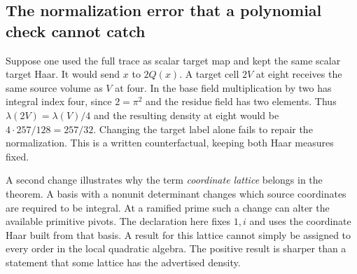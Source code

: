 \documentclass[12pt,letterpaper]{article}
\begin{document}
\subsection{The normalization error that a polynomial check cannot catch}
Suppose one used the full trace as scalar target map and kept the same scalar target Haar. It would send $x$ to $2Q(x)$. A target cell $2V$ at eight receives the same source volume as $V$ at four. In the base field multiplication by two has integral index four, since $2=\pi^2$ and the residue field has two elements. Thus $\lambda(2V)=\lambda(V)/4$ and the resulting density at eight would be $4\cdot257/128=257/32$. Changing the target label alone fails to repair the normalization. This is a written counterfactual, keeping both Haar measures fixed.
\par
A second change illustrates why the term \emph{coordinate lattice} belongs in the theorem. A basis with a nonunit determinant changes which source coordinates are required to be integral. At a ramified prime such a change can alter the available primitive pivots. The declaration here fixes $1,i$ and uses the coordinate Haar built from that basis. A result for this lattice cannot simply be assigned to every order in the local quadratic algebra. The positive result is sharper than a statement that some lattice has the advertised density.
\end{document}
